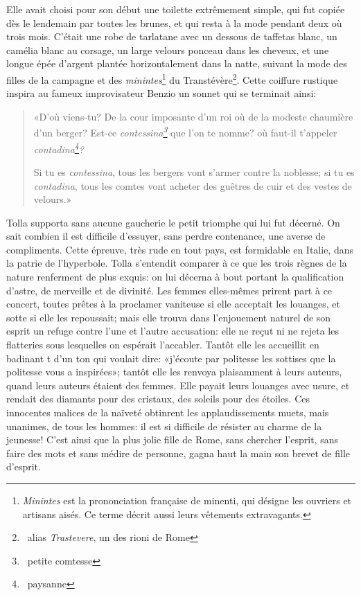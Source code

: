 Elle avait choisi pour son début une toilette extrêmement simple, qui fut copiée dès le lendemain par toutes les brunes, et qui resta à la mode pendant deux où trois mois. C’était une robe de tarlatane avec un dessous de taffetas blanc, un camélia blanc au corsage, un large velours ponceau dans les cheveux, et une longue épée d’argent plantée horizontalement dans la natte, suivant la mode des filles de la campagne et des \emph{minintes}\footnote{\emph{Minintes} est la prononciation française de minenti, qui désigne les ouvriers et artisans aisés. Ce terme décrit aussi leurs vêtements extravagants.} du Transtévère\footnote{~alias \emph{Trastevere}, un des rioni de Rome}. Cette coiffure rustique inspira au fameux improvisateur Benzio un sonnet qui se terminait ainsi:

\begin{quote}
«D’où viens-tu? De la cour imposante d’un roi où de la modeste chaumière d’un berger? Est-ce \emph{contessina\footnote{~petite comtesse}} que l’on te nomme? où faut-il t’appeler \emph{contadina\footnote{~paysanne}?}

Si tu es \emph{contessina}, tous les bergers vont s’armer contre la noblesse; si tu es \emph{contadina}, tous les comtes vont acheter des guêtres de cuir et des vestes de velours.»
\end{quote}

Tolla supporta sans aucune gaucherie le petit triomphe qui lui fut décerné. On sait combien il est difficile d’essuyer, sans perdre contenance, une averse de compliments. Cette épreuve, très rude en tout pays, est formidable en Italie, dans la patrie de l’hyperbole. Tolla s’entendit comparer à ce que les trois règnes de la nature renferment de plus exquis: on lui décerna à bout portant la qualification d’astre, de merveille et de divinité. Les femmes elles-mêmes prirent part à ce concert, toutes prêtes à la proclamer vaniteuse si elle acceptait les louanges, et sotte si elle les repoussait; mais elle trouva dans l’enjouement naturel de son esprit un refuge contre l’une et l’autre accusation: elle ne reçut ni ne rejeta les flatteries sous lesquelles on espérait l’accabler. Tantôt elle les accueillit en badinant t d’un ton qui voulait dire: «j’écoute par politesse les sottises que la politesse vous a inspirées»; tantôt elle les renvoya plaisamment à leurs auteurs, quand leurs auteurs étaient des femmes. Elle payait leurs louanges avec usure, et rendait des diamants pour des cristaux, des soleils pour des étoiles. Ces innocentes malices de la naïveté obtinrent les applaudissements muets, mais unanimes, de tous les hommes: il est si difficile de résister au charme de la jeunesse! C’est ainsi que la plus jolie fille de Rome, sans chercher l’esprit, sans faire des mots et sans médire de personne, gagna haut la main son brevet de fille d’esprit.

